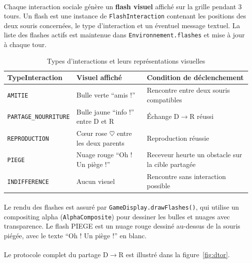 \paragraph{} Chaque interaction sociale génère un \textbf{flash visuel} affiché sur la grille pendant 3 tours. Un flash est une instance de \texttt{FlashInteraction} contenant les positions des deux souris concernées, le type d'interaction et un éventuel message textuel. La liste des flashes actifs est maintenue dans \texttt{Environnement.flashes} et mise à jour à chaque tour.

\begin{table}[h!]
\centering
\renewcommand{\arraystretch}{1.5}
\begin{tabular}{|l|l|p{5.5cm}|}
\hline
\textbf{TypeInteraction} & \textbf{Visuel affiché} & \textbf{Condition de déclenchement} \\
\hline
\texttt{AMITIE} & Bulle verte ``amis !'' & Rencontre entre deux souris compatibles \\
\hline
\texttt{PARTAGE\_NOURRITURE} & Bulle jaune ``info !'' entre D et R & Échange D$\rightarrow$R réussi \\
\hline
\texttt{REPRODUCTION} & Cœur rose $\heartsuit$ entre les deux parents & Reproduction réussie \\
\hline
\texttt{PIEGE} & Nuage rouge ``Oh ! Un piège !'' & Receveur heurte un obstacle sur la cible partagée \\
\hline
\texttt{INDIFFERENCE} & Aucun visuel & Rencontre sans interaction possible \\
\hline
\end{tabular}
\caption{Types d'interactions et leurs représentations visuelles}
\label{tab:interactions}
\end{table}

\paragraph{} Le rendu des flashes est assuré par \texttt{GameDisplay.drawFlashes()}, qui utilise un compositing alpha (\texttt{AlphaComposite}) pour dessiner les bulles et nuages avec transparence. Le flash PIEGE est un nuage rouge dessiné au-dessus de la souris piégée, avec le texte ``Oh ! Un piège !'' en blanc.

\paragraph{} Le protocole complet du partage D$\rightarrow$R est illustré dans la figure~\ref{fig:dtor}.

